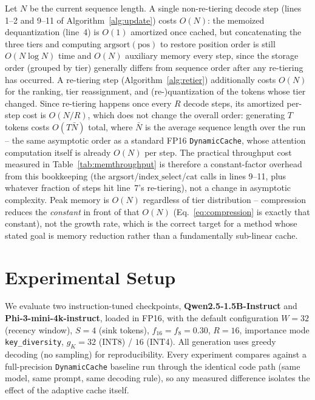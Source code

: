 \documentclass[conference]{IEEEtran}
\begin{document}
Let $N$ be the current sequence length. A single non-re-tiering decode step
(lines 1--2 and 9--11 of Algorithm~\ref{alg:update}) costs $O(N)$: the memoized
dequantization (line~4) is $O(1)$ amortized once cached, but concatenating the three
tiers and computing $\mathrm{argsort}(\mathrm{pos})$ to restore position order is
still $O(N \log N)$ time and $O(N)$ auxiliary memory every step, since the storage
order (grouped by tier) generally differs from sequence order after any re-tiering
has occurred. A re-tiering step (Algorithm~\ref{alg:retier}) additionally costs
$O(N)$ for the ranking, tier reassignment, and (re-)quantization of the tokens whose
tier changed. Since re-tiering happens once every $R$ decode steps, its amortized
per-step cost is $O(N/R)$, which does not change the overall order: generating $T$
tokens costs $O(T \bar N)$ total, where $\bar N$ is the average sequence length over
the run -- the same asymptotic order as a standard FP16 \texttt{DynamicCache}, whose
attention computation itself is already $O(N)$ per step. The practical throughput cost
measured in Table~\ref{tab:memthroughput} is therefore a constant-factor overhead from
this bookkeeping (the $\mathrm{argsort}$/$\mathrm{index\_select}$/$\mathrm{cat}$ calls
in lines 9--11, plus whatever fraction of steps hit line~7's re-tiering), not a change
in asymptotic complexity. Peak memory is $O(N)$ regardless of tier distribution --
compression reduces the \emph{constant} in front of that $O(N)$ (Eq.~\ref{eq:compression}
is exactly that constant), not the growth rate, which is the correct target for a
method whose stated goal is memory reduction rather than a fundamentally sub-linear
cache.

\section{Experimental Setup}

We evaluate two instruction-tuned checkpoints, \textbf{Qwen2.5-1.5B-Instruct} and
\textbf{Phi-3-mini-4k-instruct}, loaded in FP16, with the default configuration
$W{=}32$ (recency window), $S{=}4$ (sink tokens), $f_{16}{=}f_{8}{=}0.30$, $R{=}16$,
importance mode \texttt{key\_diversity}, $g_K{=}32$ (INT8) / $16$ (INT4). All
generation uses greedy decoding (no sampling) for reproducibility. Every experiment
compares against a full-precision \texttt{DynamicCache} baseline run through the
identical code path (same model, same prompt, same decoding rule), so any measured
difference isolates the effect of the adaptive cache itself.
\end{document}
